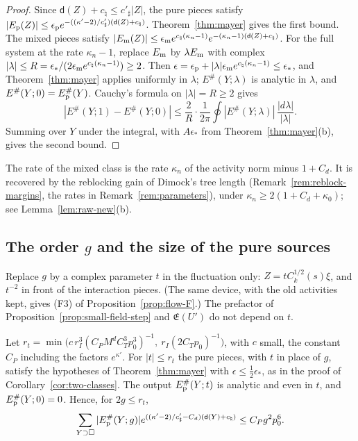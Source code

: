 \begin{proof}
Since $\mathsf d(Z)+c_\natural\le c'_\sharp|Z|$, the pure pieces satisfy $|E_{\rm p}(Z)|\le\epsilon_{\rm p}e^{-((\kappa'-2)/c'_\sharp)(\mathsf d(Z)+c_\natural)}$. Theorem~\ref{thm:mayer} gives the first bound. The mixed pieces satisfy $|E_{\rm m}(Z)|\le\epsilon_{\rm m}e^{c_\natural(\kappa_n-1)}e^{-(\kappa_n-1)(\mathsf d(Z)+c_\natural)}$. For the full system at the rate $\kappa_n-1$, replace $E_{\rm m}$ by $\lambda E_{\rm m}$ with complex $|\lambda|\le R=\epsilon_*/(2\epsilon_{\rm m}e^{c_\natural(\kappa_n-1)})\ge2$. Then $\epsilon=\epsilon_{\rm p}+|\lambda|\epsilon_{\rm m}e^{c_\natural(\kappa_n-1)}\le\epsilon_*$, and Theorem~\ref{thm:mayer} applies uniformly in $\lambda$; $E^\#(Y;\lambda)$ is analytic in $\lambda$, and $E^\#(Y;0)=E^\#_{\rm p}(Y)$. Cauchy's formula on $|\lambda|=R\ge2$ gives
\[
|E^\#(Y;1)-E^\#(Y;0)|\le\frac2R\cdot\frac1{2\pi}\oint|E^\#(Y;\lambda)|\,\frac{|d\lambda|}{|\lambda|}.
\]
Summing over $Y$ under the integral, with $A\epsilon_*$ from Theorem~\ref{thm:mayer}(b), gives the second bound.
\end{proof}

The rate of the mixed class is the rate $\kappa_n$ of the activity norm minus $1+C_d$. It is recovered by the reblocking gain of Dimock's tree length (Remark~\ref{rem:reblock-margins}, the rates in Remark~\ref{rem:parameters}), under $\kappa_n\ge2(1+C_d+\kappa_0)$; see Lemma~\ref{lem:raw-new}(b).

\subsection{\texorpdfstring{The order $g$ and the size of the pure sources}{The order g and the size of the pure sources}}\label{subsec:cl-order}

Replace $g$ by a complex parameter $t$ in the fluctuation only: $Z=tC_k^{1/2}(s)\xi$, and $t^{-2}$ in front of the interaction pieces. (The same device, with the old activities kept, gives (F3) of Proposition~\ref{prop:flow-F}.) The prefactor of Proposition~\ref{prop:small-field-step} and $\mathfrak E(U')$ do not depend on $t$.

\begin{proposition}\label{prop:pure-sources}
Let $r_t=\min\big(c\,r_I^3(C_PM^dC_T^3p_0^3)^{-1},\ r_I(2C_Tp_0)^{-1}\big)$, with $c$ small, the constant $C_P$ including the factors $e^{\kappa'}$. For $|t|\le r_t$ the pure pieces, with $t$ in place of $g$, satisfy the hypotheses of Theorem~\ref{thm:mayer} with $\epsilon\le\frac12\epsilon_*$, as in the proof of Corollary~\ref{cor:two-classes}. The output $E^\#_{\rm p}(Y;t)$ is analytic and even in $t$, and $E^\#_{\rm p}(Y;0)=0$. Hence, for $2g\le r_t$,
\[
\sum_{Y\supset\Box}|E^\#_{\rm p}(Y;g)|e^{((\kappa'-2)/c'_\sharp-C_d)(\mathsf d(Y)+c_\natural)}\le C_Pg^2p_0^6 .
\]
\end{proposition}

